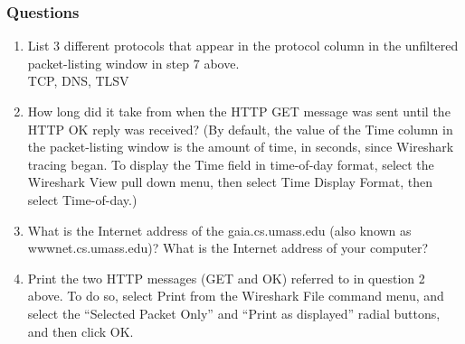     \subsubsection*{Questions}
        \begin{enumerate}
        [label=\bfseries Problem \arabic*:,leftmargin=*,labelindent=1em]
            \item List 3 different protocols that appear in the protocol column in the unfiltered packet-listing window in step 7 above.\\[0.2mm]
            \soln TCP, DNS, TLSV
            
            \item How long did it take from when the HTTP GET message was sent until the HTTP OK reply was received? 
            (By default, the value of the Time column in the packet-listing window is the amount of time, in seconds, 
            since Wireshark tracing began. To display the Time field in time-of-day format,
            select the Wireshark View pull down menu, then select Time Display Format, then select Time-of-day.) \\[0.2mm]
            \soln
            
            \item What is the Internet address of the gaia.cs.umass.edu (also known as wwwnet.cs.umass.edu)? 
            What is the Internet address of your computer?\\[0.2mm]
            \soln
            
            \item Print the two HTTP messages (GET and OK) referred to in question 2 above. 
            To do so, select Print from the Wireshark File command menu, and select the “Selected Packet Only” 
            and “Print as displayed” radial buttons, and then click OK.\\[0.2mm]
            \soln 
            

\end{enumerate}
